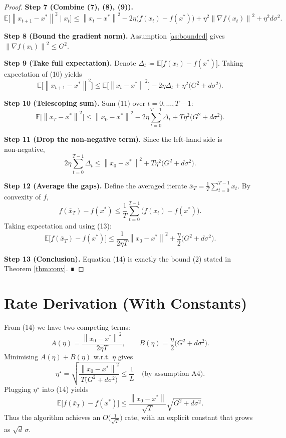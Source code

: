 \documentclass{article}
\newcommand{\EE}{\mathbb{E}}
\newcommand{\norm}[1]{\left\lVert #1 \right\rVert}
\begin{document}
\begin{proof}
\textbf{Step 7 (Combine (7), (8), (9)).}
\[
\EE\!\bigl[\norm{x_{t+1}-x^{\ast}}^{2}\mid x_{t}\bigr]
\le
\norm{x_{t}-x^{\ast}}^{2}
-2\eta\bigl(f(x_{t})-f(x^{\ast})\bigr)
+\eta^{2}\norm{\nabla f(x_{t})}^{2}
+\eta^{2}d\sigma^{2}. \tag{10}
\]

\textbf{Step 8 (Bound the gradient norm).}  
Assumption \ref{as:bounded} gives $\norm{\nabla f(x_{t})}^{2}\le G^{2}$.

\textbf{Step 9 (Take full expectation).}
Denote $\Delta_{t}\coloneqq\EE\!\bigl[f(x_{t})-f(x^{\ast})\bigr]$. Taking expectation of (10) yields
\[
\EE\!\bigl[\norm{x_{t+1}-x^{\ast}}^{2}\bigr]
\le
\EE\!\bigl[\norm{x_{t}-x^{\ast}}^{2}\bigr]
-2\eta\Delta_{t}
+\eta^{2}\bigl(G^{2}+d\sigma^{2}\bigr). \tag{11}
\]

\textbf{Step 10 (Telescoping sum).}  
Sum (11) over $t=0,\dots,T-1$:
\[
\EE\!\bigl[\norm{x_{T}-x^{\ast}}^{2}\bigr]
\le
\norm{x_{0}-x^{\ast}}^{2}
-2\eta\sum_{t=0}^{T-1}\Delta_{t}
+T\eta^{2}\bigl(G^{2}+d\sigma^{2}\bigr). \tag{12}
\]

\textbf{Step 11 (Drop the non‑negative term).}  
Since the left‑hand side is non‑negative,
\[
2\eta\sum_{t=0}^{T-1}\Delta_{t}
\le
\norm{x_{0}-x^{\ast}}^{2}
+T\eta^{2}\bigl(G^{2}+d\sigma^{2}\bigr). \tag{13}
\]

\textbf{Step 12 (Average the gaps).}  
Define the averaged iterate $\bar x_{T}=\frac{1}{T}\sum_{t=0}^{T-1}x_{t}$. By convexity of $f$,
\[
f(\bar x_{T})-f(x^{\ast})
\le \frac{1}{T}\sum_{t=0}^{T-1}\bigl(f(x_{t})-f(x^{\ast})\bigr).
\]
Taking expectation and using (13):
\[
\EE\!\bigl[f(\bar x_{T})-f(x^{\ast})\bigr]
\le
\frac{1}{2\eta T}\norm{x_{0}-x^{\ast}}^{2}
+\frac{\eta}{2}\bigl(G^{2}+d\sigma^{2}\bigr). \tag{14}
\]

\textbf{Step 13 (Conclusion).}  
Equation (14) is exactly the bound (2) stated in Theorem \ref{thm:conv}. ∎
\end{proof}

\section*{Rate Derivation (With Constants)}
From (14) we have two competing terms:
\[
A(\eta)=\frac{\norm{x_{0}-x^{\ast}}^{2}}{2\eta T},
\qquad
B(\eta)=\frac{\eta}{2}\bigl(G^{2}+d\sigma^{2}\bigr).
\]
Minimising $A(\eta)+B(\eta)$ w.r.t. $\eta$ gives
\[
\eta^{\star}= \sqrt{\frac{\norm{x_{0}-x^{\ast}}^{2}}{T\bigl(G^{2}+d\sigma^{2}\bigr)}}
\le\frac{1}{L}\quad\text{(by assumption A4)}.
\]
Plugging $\eta^{\star}$ into (14) yields
\[
\EE\!\bigl[f(\bar x_{T})-f(x^{\ast})\bigr]
\le
\frac{\norm{x_{0}-x^{\ast}}}{\sqrt{T}}\sqrt{G^{2}+d\sigma^{2}}.
\tag{15}
\]
Thus the algorithm achieves an $O\!\bigl(\tfrac{1}{\sqrt{T}}\bigr)$ rate, with an explicit constant that grows as $\sqrt{d}\,\sigma$.
\end{document}
